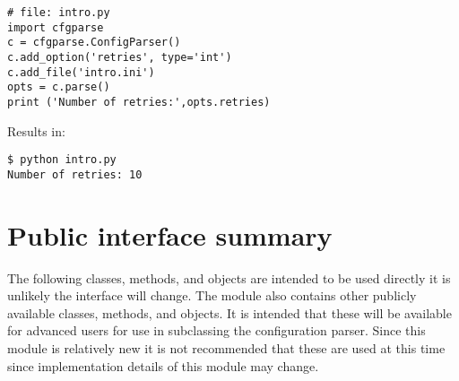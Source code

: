 \documentclass{howto}
\begin{document}
\begin{verbatim}
# file: intro.py
import cfgparse
c = cfgparse.ConfigParser()
c.add_option('retries', type='int')
c.add_file('intro.ini')
opts = c.parse()
print ('Number of retries:',opts.retries)
\end{verbatim}

Results in:

\begin{verbatim}
$ python intro.py
Number of retries: 10
\end{verbatim}


\pagebreak


\section{Public interface summary}

The following classes, methods, and objects are intended to be used directly
it is unlikely the interface will change.
The module also contains other publicly available classes, methods, and 
objects.  It is intended that these will be available for advanced users 
for use in subclassing the configuration parser.  Since this module is 
relatively new it is not recommended that these are used at this time since
implementation details of this module may change.
\end{document}
